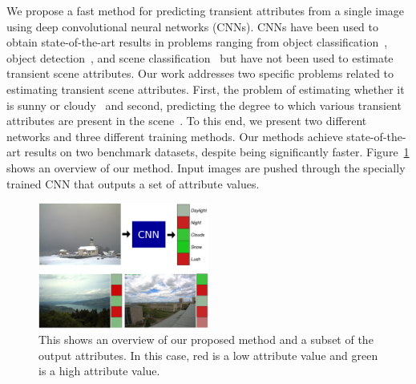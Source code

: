 \documentclass[10pt,twocolumn,letterpaper]{article}
\newcommand{\todo}[1]{\textcolor{red}{todo: {\em #1}}}
\newcommand{\figref}[1]{Figure~\ref{fig:#1}}
\begin{document}

We propose a fast method for predicting transient attributes from a single
image using deep convolutional neural networks (CNNs). CNNs have been used to
obtain state-of-the-art results in problems ranging from object
classification~\cite{krizhevsky2012imagenet}, object
detection~\cite{girshick2013rich}, and scene
classification~\cite{zhou2014places} but have not been used to estimate
transient scene attributes. Our work addresses two specific problems related to
estimating transient scene attributes. First, the problem of estimating whether
it is sunny or cloudy~\cite{lutwoclass} and second, predicting the degree to
which various transient attributes are present in the scene~\cite{Laffont14}.
To this end, we present two different networks and three different training
methods. Our methods achieve state-of-the-art results on two benchmark
datasets, despite being significantly faster.  \figref{cartoon} shows an
overview of our method.  Input images are pushed through the specially trained
CNN that outputs a set of attribute values.


\begin{figure}[t]
	\centering
		\includegraphics[width=0.5\textwidth, trim= 0mm 0mm 0mm 0mm]{figs/cartoon.pdf}
		\caption{This shows an overview of our proposed method and a subset of the
             output attributes.  In this case, red is a low attribute value and
             green is a high attribute value.}
		\label{fig:cartoon}
\end{figure}

\end{document}
